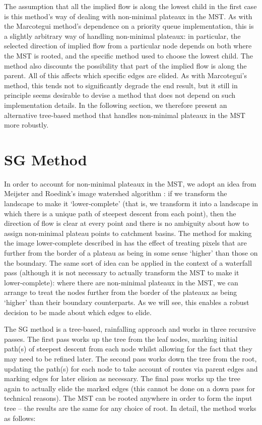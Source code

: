 \documentclass[preprint,a4paper]{elsarticle}
\begin{document}
The assumption that all the implied flow is along the lowest child in the first case is this method's way of dealing with non-minimal plateaux in the MST. As with the Marcotegui method's dependence on a priority queue implementation, this is a slightly arbitrary way of handling non-minimal plateaux: in particular, the selected direction of implied flow from a particular node depends on both where the MST is rooted, and the specific method used to choose the lowest child. The method also discounts the possibility that part of the implied flow is along the parent. All of this affects which specific edges are elided. As with Marcotegui's method, this tends not to significantly degrade the end result, but it still in principle seems desirable to devise a method that does not depend on such implementation details. In the following section, we therefore present an alternative tree-based method that handles non-minimal plateaux in the MST more robustly.

\section{SG Method}
\label{sec:golodetz}

In order to account for non-minimal plateaux in the MST, we adopt an idea from Meijster and Roedink's image watershed algorithm \cite{meijster98}: if we transform the landscape to make it `lower-complete' (that is, we transform it into a landscape in which there is a unique path of steepest descent from each point), then the direction of flow is clear at every point and there is no ambiguity about how to assign non-minimal plateau points to catchment basins. The method for making the image lower-complete described in \cite{meijster98} has the effect of treating pixels that are further from the border of a plateau as being in some sense `higher' than those on the boundary. The same sort of idea can be applied in the context of a waterfall pass (although it is not necessary to actually transform the MST to make it lower-complete): where there are non-minimal plateaux in the MST, we can arrange to treat the nodes further from the border of the plateaux as being `higher' than their boundary counterparts. As we will see, this enables a robust decision to be made about which edges to elide.

The SG method is a tree-based, rainfalling approach and works in three recursive passes. The first pass works up the tree from the leaf nodes, marking initial path(s) of steepest descent from each node whilst allowing for the fact that they may need to be refined later. The second pass works down the tree from the root, updating the path(s) for each node to take account of routes via parent edges and marking edges for later elision as necessary. The final pass works up the tree again to actually elide the marked edges (this cannot be done on a down pass for technical reasons). The MST can be rooted anywhere in order to form the input tree -- the results are the same for any choice of root. In detail, the method works as follows:
\end{document}
